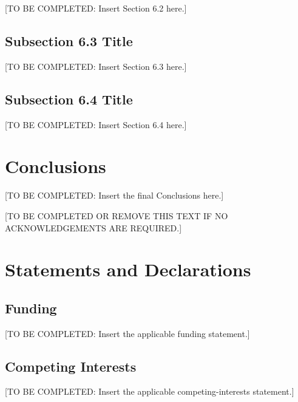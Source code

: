 \documentclass[pdflatex,sn-mathphys-num,iicol]{sn-jnl}
\begin{document}
[TO BE COMPLETED: Insert Section 6.2 here.]

\subsection{Subsection 6.3 Title}\label{subsec:discussion63}

[TO BE COMPLETED: Insert Section 6.3 here.]

\subsection{Subsection 6.4 Title}\label{subsec:discussion64}

[TO BE COMPLETED: Insert Section 6.4 here.]

\section{Conclusions}\label{sec:conclusions}

[TO BE COMPLETED: Insert the final Conclusions here.]

\backmatter


[TO BE COMPLETED OR REMOVE THIS TEXT IF NO ACKNOWLEDGEMENTS ARE REQUIRED.]

\section*{Statements and Declarations}

\subsection*{Funding}
[TO BE COMPLETED: Insert the applicable funding statement.]

\subsection*{Competing Interests}
[TO BE COMPLETED: Insert the applicable competing-interests statement.]
\end{document}

